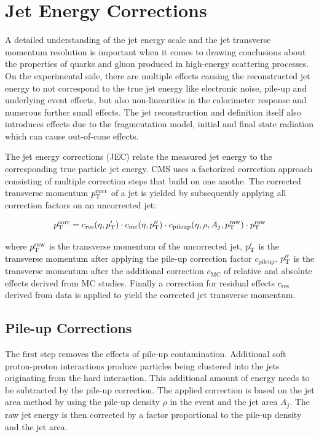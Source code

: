 \section{Jet Energy Corrections}

A detailed understanding of the jet energy scale and the jet transverse momentum
resolution is important when it comes to drawing conclusions about the
properties of quarks and gluon produced in high-energy scattering processes. On the
experimental side, there are multiple effects causing the reconstructed jet
energy to not correspond to the true jet energy like electronic noise, pile-up
and underlying event effects, but also non-linearities in the calorimeter
response and numerous further small effects. The jet reconstruction and
definition itself also introduces effects due to the fragmentation model,
initial and final state radiation which can cause out-of-cone effects.

The jet energy corrections (JEC) relate the measured jet energy to the
corresponding true particle jet energy. CMS uses a factorized correction approach
consisting of multiple correction steps that build on one anothe. The corrected
transverse momentum $p_{\mathrm{T}}^{\mathrm{corr}}$ of a jet is yielded by subsequently applying all correction
factors on an uncorrected jet:

\begin{equation*}
    p_{\mathrm{T}}^{\mathrm{corr}} = c_{\mathrm{res}} (\eta, p_{\mathrm{T}}^{\prime}) \cdot c_{\mathrm{mc}}
    (\eta, p_{\mathrm{T}}^{\prime\prime}) \cdot c_{\mathrm{pileup}}(\eta, \rho, A_j, p_{\mathrm{T}}^{\mathrm{raw}}) \cdot p_{\mathrm{T}}^{\mathrm{raw}} 
\end{equation*}

where $p_{\mathrm{T}}^{\mathrm{raw}}$ is the transverse momentum of the uncorrected jet,
$p_{\mathrm{T}}^{\prime}$ is the transverse momentum after applying the pile-up correction
factor $c_{\mathrm{pileup}}$. $p_{\mathrm{T}}^{\prime\prime}$ is the transverse momentum
after the additional correction $c_\mathrm{MC}$ of relative and absolute effects
derived from MC studies. Finally a correction for residual effects
$c_{\mathrm{res}}$ derived from data is applied to yield the corrected jet
transverse momentum.

\subsection{Pile-up Corrections}
\label{pileup_correction}

The first step removes the effects of pile-up contamination. Additional soft
proton-proton interactions produce particles being clustered into the jets
originating from the hard interaction. This additional amount of energy needs to
be subtracted by the pile-up correction. The applied correction is based on the
jet area method by using the pile-up density $\rho$ in the event and the jet
area $A_j$. The raw jet energy is then corrected by a factor proportional to the
pile-up density and the jet area.

